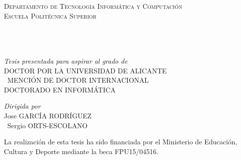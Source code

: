 \begin{titlepage}
\begin{center}

\textsc{\LARGE Departamento de Tecnología Informática y Computación}\\[1.5cm] %
\textsc{\Large Escuela Politécnica Superior}\\[0.5cm] %

{\huge \bfseries \ttitle}\\[0.4cm] %
 
\begin{center} \large
{\authorname} %
\\\ \\
\emph{Tesis presentada para aspirar al grado de} \\
{DOCTOR POR LA UNIVERSIDAD DE ALICANTE}\\\
{MENCIÓN DE DOCTOR INTERNACIONAL}\\
{DOCTORADO EN INFORMÁTICA}\\
\end{center}

\vfill
 
\large \textit{Dirigida por}\\[0.3cm] %
{Jose GARCÍA RODRÍGUEZ}\\\
{Sergio ORTS-ESCOLANO}\\
 
 \vfill
 
{\large La realización de esta tesis ha sido financiada por el Ministerio de Educación, Cultura y Deporte mediante la beca FPU15/04516.}\\[4cm] %
 
\end{center}
\end{titlepage}
